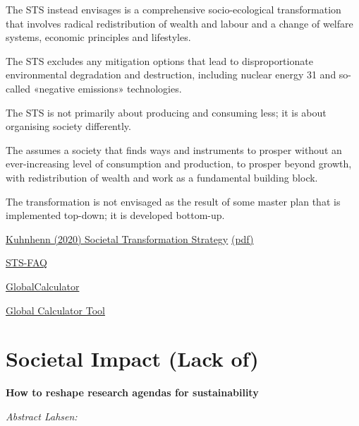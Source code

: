 \documentclass[
]{book}
\begin{document}
The STS instead envisages is a comprehensive socio-ecological transformation
that involves radical redistribution of wealth and labour and a change of welfare
systems, economic principles and lifestyles.

The STS excludes any mitigation options that lead to
disproportionate environmental degradation and destruction, including nuclear
energy 31 and so-called «negative emissions» technologies.

The STS is not primarily
about producing and consuming less; it is about organising society differently.

The assumes a society that finds ways and instruments to prosper
without an ever-increasing level of consumption and production, to prosper beyond
growth, with redistribution of wealth and work as a fundamental building block.

The transformation is not envisaged as the result of some master plan that is
implemented top-down; it is developed bottom-up.

\href{https://eu.boell.org/en/2020/12/09/societal-transformation-scenario-staying-below-15degc}{Kuhnhenn (2020) Societal Transformation Strategy}
\href{pdf/Kuhnhenn_2020_STS.pdf}{(pdf)}

\href{https://www.boell.de/en/2020/12/08/faqs-societal-transformation-scenario-sts}{STS-FAQ}

\href{http://www.globalcalculator.org/}{GlobalCalculator}

\href{http://tool.globalcalculator.org/globcalc.html?levers=22rfoe2e13be1111c2c2c1n31hfjdcef222hp233f211111fn2211111111/dashboard/en}{Global Calculator Tool}

\hypertarget{societal-impact-lack-of}{%
\section{Societal Impact (Lack of)}\label{societal-impact-lack-of}}

\textbf{How to reshape research agendas for sustainability}

\emph{Abstract Lahsen:}
\end{document}
